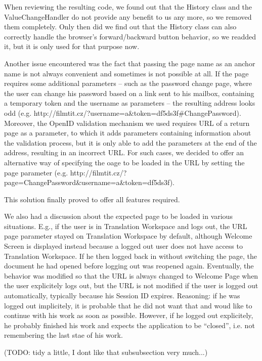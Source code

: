 When reviewing the resulting code, we found out that the History class and the ValueChangeHandler do not provide any benefit to us any more, so we removed them completely. Only then did we find out that the History class can also correctly handle the browser's forward/backward button behavior, so we readded it, but it is only used for that purpose now.

Another issue encountered was the fact that passing the page name as an anchor name is not always convenient and sometimes is not possible at all. If the page requires some additional parameters -- such as the password change page, where the user can change his password based on a link sent to his mailbox, containing a temporary token and the username as parameters -- the resulting address looks odd (e.g. http://filmtit.cz/?username=a\&token=df5ds3f\#ChangePassword). Moreover, the OpenID validation mechanism we used requires URL of a return page as a parameter, to which it adds parameters containing information about the validation process, but it is only able to add the parameters at the end of the address, resulting in an incorrect URL. For such cases, we decided to offer an alternative way of specifying the oage to be loaded in the URL by setting the page parameter (e.g. http://filmtit.cz/?page=ChangePassword\&username=a\&token=df5ds3f).

This solution finally proved to offer all features required.

We also had a discussion about the expected page to be loaded in various situations. E.g., if the user is in Translation Workspace and logs out, the URL page parameter stayed on Translation Workspace by default, although Welcome Screen is displayed instead because a logged out user does not have access to Translation Workspace. If he then logged back in without switching the page, the document he had opened before logging out was reopened again.
Eventually, the behavior was modified so that the URL is always changed to Welcome Page when the user explicitely logs out, but the URL is not modified if the user is logged out automatically, typically because his Session ID expires. Reasoning: if he was logged out implicitely, it is probable that he did not want that and woud like to continue with his work as soon as possible. However, if he logged out explicitely, he probably finished his work and expects the application to be ``closed'', i.e. not remembering the last stae of his work.

(TODO: tidy a little, I dont like that subsubsection very much...)

